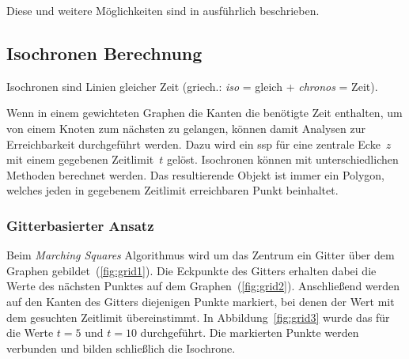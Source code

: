 Diese und weitere Möglichkeiten sind in \cite[209--213]{kurt} ausführlich beschrieben.

\subsection{Isochronen Berechnung}

Isochronen sind Linien gleicher Zeit (griech.: \textit{iso} = gleich + \textit{chronos} = Zeit).

Wenn in einem gewichteten Graphen die Kanten die benötigte Zeit enthalten, um von einem Knoten zum nächsten zu gelangen, können damit Analysen zur Erreichbarkeit durchgeführt werden.
Dazu wird ein \gls{ssp} für eine zentrale Ecke~$z$ mit einem gegebenen Zeitlimit~$t$ gelöst.
Isochronen können mit unterschiedlichen Methoden berechnet werden.
Das resultierende Objekt ist immer ein Polygon, welches jeden in gegebenem Zeitlimit erreichbaren Punkt beinhaltet.


\subsubsection{Gitterbasierter Ansatz}

Beim \textit{Marching Squares} Algorithmus wird um das Zentrum ein Gitter über dem Graphen gebildet~(\ref{fig:grid1}).
Die Eckpunkte des Gitters erhalten dabei die Werte des nächsten Punktes auf dem Graphen~(\ref{fig:grid2}).
Anschließend werden auf den Kanten des Gitters diejenigen Punkte markiert, bei denen der Wert mit dem gesuchten Zeitlimit übereinstimmt.
In Abbildung~\ref{fig:grid3} wurde das für die Werte $t=5$ und $t=10$ durchgeführt.
Die markierten Punkte werden verbunden und bilden schließlich die Isochrone.

